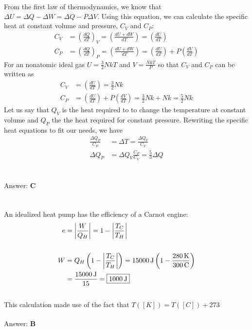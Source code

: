 \documentclass[12pt]{article}
\newcommand{\Answer}[1]{Answer: \textbf{#1}}
\newcommand{\Problem}[3]{
    \setcounter{section}{#1}
    \addtocounter{section}{-1}
    \section{}
    #3\\\\
    \Answer{#2}
}
\begin{document}
\Problem{34}{C}{%
From the first law of thermodynamics, we know that $\Delta U = \Delta Q - \Delta W = \Delta Q - P\Delta V$. Using this equation, we can calculate the specific heat at constant volume and pressure, $C_{V}$ and $C_{P}$:
\begin{align}
C_{V} &= {\left(\frac{d Q}{d T}\right)}_{V} = \left(\frac{d U + dW}{d T}\right) = \left(\frac{d U}{d T}\right)\\
C_{P} &= {\left(\frac{d Q}{d T}\right)}_{P} = \left(\frac{d U + dW}{d T}\right) = \left(\frac{d U}{d T}\right) + P\left(\frac{d V}{d T}\right)
\end{align}
For an nonatomic ideal gas $U = \frac{3}{2}NkT$ and $V= \frac{NkT}{P}$ so that $C_{V}$ and $C_{P}$ can be written as
\begin{align}
C_{V} &= \left(\frac{d U}{d T}\right) = \frac{3}{2}Nk\nonumber\\
C_{P} &= \left(\frac{d U}{d T}\right) + P\left(\frac{d V}{d T}\right) =  \frac{3}{2}Nk + Nk = \frac{5}{2}Nk\nonumber
\end{align}
Let us say that $Q_{V}$ is the heat required to to change the temperature at constant volume and $Q_{P}$ the the heat required for constant pressure. Rewriting the specific heat equations to fit our needs, we have
\begin{align}
\frac{\Delta Q_{P}}{C_{P}} &= \Delta T = \frac{\Delta Q_{V}}{C_{V}}\nonumber\\
\Delta Q_{P} &= \Delta Q_{V}\frac{C_{P}}{C_{V}} = \boxed{\frac{5}{3} \Delta Q}
\end{align}
}

\Problem{35}{B}{%
An idealized heat pump has the efficiency of a Carnot engine:
\begin{align}
e &= \left| \frac{W}{Q_{H}}\right| = 1- \left|\frac{T_{C}}{T_{H}}\right|\\
\nonumber \\
W &= Q_{H} \left(1- \left|\frac{T_{C}}{T_{H}}\right|\right)= 15000\,\text{J} \left(1- \frac{280\,\text{K}}{300\,\text{C}}\right)\nonumber \\
 &= \frac{15000\,\text{J}}{15} = \boxed{1000\,\text{J}}\nonumber
\end{align}
\\
This calculation made use of the fact that $T([K]) = T([C]) + 273$
}
\end{document}
